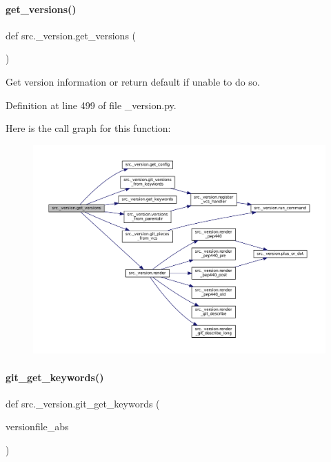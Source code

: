 \paragraph{\texorpdfstring{get\+\_\+versions()}{get\_versions()}}
{\footnotesize\ttfamily def src.\+\_\+version.\+get\+\_\+versions (\begin{DoxyParamCaption}{ }\end{DoxyParamCaption})}



Get version information or return default if unable to do so. 



Definition at line 499 of file \+\_\+version.\+py.

Here is the call graph for this function\+:
\nopagebreak
\begin{figure}[H]
\begin{center}
\leavevmode
\includegraphics[width=350pt]{namespacesrc_1_1__version_ab09491ecacc235eeaa4a2e433ce17977_cgraph}
\end{center}
\end{figure}
\mbox{\label{namespacesrc_1_1__version_a55b4959421edb5200447f5199d19f4c1}} 
\paragraph{\texorpdfstring{git\+\_\+get\+\_\+keywords()}{git\_get\_keywords()}}
{\footnotesize\ttfamily def src.\+\_\+version.\+git\+\_\+get\+\_\+keywords (\begin{DoxyParamCaption}\item[{}]{versionfile\+\_\+abs }\end{DoxyParamCaption})}



